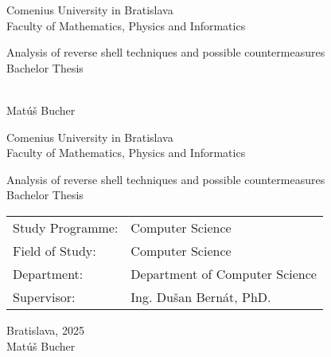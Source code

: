 \documentclass[12pt, twoside]{book}
\def\mfrok{2025}
\def\mfnazov{Analysis of reverse shell techniques and possible countermeasures}
\def\mftyp{Bachelor Thesis}
\def\mfautor{Matúš Bucher}
\def\mfskolitel{Ing. Dušan Bernát, PhD.}
\def\mfmiesto{Bratislava, \mfrok}
\def\mfodbor{Computer Science}
\def\program{Computer Science }
\def\mfpracovisko{ Department of Computer Science }
\begin{document}
\frontmatter
\pagestyle{empty}


\begin{center}
  \sc\large
  Comenius University in Bratislava\\
  Faculty of Mathematics, Physics and Informatics

\vfill

{\LARGE\mfnazov}\\
\mftyp
\end{center}

\vfill

{\sc\large 
\noindent \mfrok\\
\mfautor
}

\cleardoublepage


\noindent

\begin{center}
\sc  
\large
  Comenius University in Bratislava\\
  Faculty of Mathematics, Physics and Informatics

\vfill

{\LARGE\mfnazov}\\
\mftyp
\end{center}

\vfill

\noindent
\begin{tabular}{ll}
Study Programme: & \program \\
Field of Study: & \mfodbor \\
Department: & \mfpracovisko \\
Supervisor: & \mfskolitel \\
\end{tabular}

\vfill


\noindent \mfmiesto\\
\mfautor

\cleardoublepage



\newpage
\setcounter{page}{3}



\end{document}
